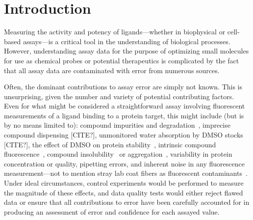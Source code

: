 \documentclass[aps,pre,twocolumn,nofootinbib,superscriptaddress,linenumbers]{revtex4-1}
\begin{document}
\section{Introduction}
\label{section:introduction}

Measuring the activity and potency of ligands---whether in biophysical or cell-based assays---is a critical tool in the understanding of biological processes.
However, understanding assay data for the purpose of optimizing small molecules for use as chemical probes or potential therapeutics is complicated by the fact that all assay data are contaminated with error from numerous sources.

Often, the dominant contributions to assay error are simply not known.
This is unsurprising, given the number and variety of potential contributing factors.
Even for what might be considered a straightforward assay involving fluorescent measurements of a ligand binding to a protein target, this might include (but is by no means limited to): compound impurities and degradation~\cite{kozikowski_effect_2003,kozikowski_effect_2003-1,cheng_studies_2003,waybright_overcoming_2009}, imprecise compound dispensing {\color{red}[CITE?]}, unmonitored water absorption by DMSO stocks {\color{red}[CITE?]}, the effect of DMSO on protein stability~\cite{tjernberg_dmso-related_2005}, intrinsic compound fluorescence~\cite{simeonov_fluorescence_2008,baell_new_2010}, compound insolubility~\cite{di_biological_2006} or aggregation~\cite{mcgovern_common_2002,mcgovern_kinase_2003,feng_high-throughput_2005,feng_synergy_2006,baell_new_2010}, variability in protein concentration or quality, pipetting errors, and inherent noise in any fluorescence measurement---not to mention stray lab coat fibers as fluorescent contaminants~\cite{busch_does_2015}. 
Under ideal circumstances, control experiments would be performed to measure the magnitude of these effects, and data quality tests would either reject flawed data or ensure that all contributions to error have been carefully accounted for in producing an assessment of error and confidence for each assayed value.
\end{document}
